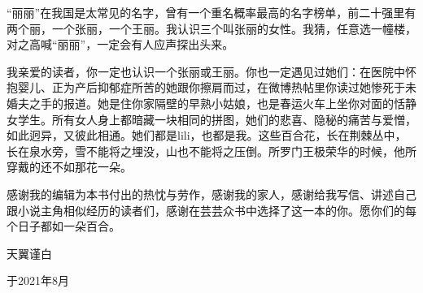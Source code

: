 \documentclass[lang=cn,newtx,12pt,scheme=chinese]{elegantbook}
\begin{document}
“丽丽”在我国是太常见的名字，曾有一个重名概率最高的名字榜单，前二十强里有两个丽，一个张丽，一个王丽。我认识三个叫张丽的女性。我猜，任意选一幢楼，对之高喊“丽丽”，一定会有人应声探出头来。

我亲爱的读者，你一定也认识一个张丽或王丽。你也一定遇见过她们：在医院中怀抱婴儿、正为产后抑郁症所苦的她跟你擦肩而过，在微博热帖里你读过她惨死于未婚夫之手的报道。她是住你家隔壁的早熟小姑娘，也是春运火车上坐你对面的恬静女学生。所有女人身上都暗藏一块相同的拼图，她们的悲喜、隐秘的痛苦与爱憎，如此迥异，又彼此相通。她们都是lili，也都是我。这些百合花，长在荆棘丛中，长在泉水旁，雪不能将之埋没，山也不能将之压倒。所罗门王极荣华的时候，他所穿戴的还不如那花一朵。

感谢我的编辑为本书付出的热忱与劳作，感谢我的家人，感谢给我写信、讲述自己跟小说主角相似经历的读者们，感谢在芸芸众书中选择了这一本的你。愿你们的每个日子都如一朵百合。

天翼谨白

于2021年8月
\end{document}
